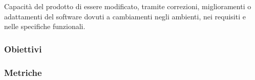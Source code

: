 Capacità del prodotto di essere modificato, tramite correzioni, miglioramenti o adattamenti del software dovuti 
a cambiamenti negli ambienti, nei requisiti e nelle specifiche funzionali.

\subsubsection{Obiettivi}


\subsubsection{Metriche}
